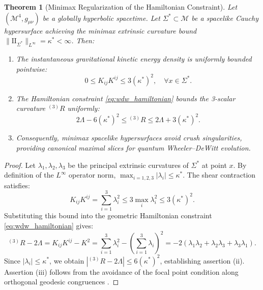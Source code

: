 \documentclass[11pt,a4paper,reqno]{amsart}
\newtheorem{theorem}{Theorem}[section]
\theoremstyle{definition}
\numberwithin{equation}{section}
\providecommand{\II}{\mathrm{I\!I}}
\providecommand{\II}{\mathrm{II}}
\begin{document}
\begin{theorem}[Minimax Regularization of the Hamiltonian Constraint]
\label{thm:minimax_hamiltonian_regularization}
Let $(\mathcal{M}^4, g_{\mu\nu})$ be a globally hyperbolic spacetime. Let $\Sigma^* \subset \mathcal{M}$ be a spacelike Cauchy hypersurface achieving the minimax extrinsic curvature bound $\|\II_{\Sigma^*}\|_{L^\infty} = \kappa^* < \infty$. Then:
\begin{enumerate}[label=(\roman*)]
    \item The instantaneous gravitational kinetic energy density is uniformly bounded pointwise:
    \begin{equation}
        \label{eq:shear_bound}
        0 \le K_{ij} K^{ij} \le 3 (\kappa^*)^2, \quad \forall x \in \Sigma^*.
    \end{equation}
    \item The Hamiltonian constraint \eqref{eq:wdw_hamiltonian} bounds the 3-scalar curvature ${}^{(3)}R$ uniformly:
    \begin{equation}
        2\Lambda - 6 (\kappa^*)^2 \le {}^{(3)}R \le 2\Lambda + 3(\kappa^*)^2.
    \end{equation}
    \item Consequently, minimax spacelike hypersurfaces avoid crush singularities, providing canonical maximal slices for quantum Wheeler--DeWitt evolution.
\end{enumerate}
\end{theorem}
\begin{proof}
Let $\lambda_1, \lambda_2, \lambda_3$ be the principal extrinsic curvatures of $\Sigma^*$ at point $x$. By definition of the $L^\infty$ operator norm, $\max_{i=1,2,3} |\lambda_i| \le \kappa^*$. The shear contraction satisfies:
\begin{equation}
    K_{ij} K^{ij} = \sum_{i=1}^3 \lambda_i^2 \le 3 \max_i \lambda_i^2 \le 3 (\kappa^*)^2.
\end{equation}
Substituting this bound into the geometric Hamiltonian constraint \eqref{eq:wdw_hamiltonian} gives:
\begin{equation}
    {}^{(3)}R - 2\Lambda = K_{ij} K^{ij} - K^2 = \sum_{i=1}^3 \lambda_i^2 - \left(\sum_{i=1}^3 \lambda_i\right)^2 = -2(\lambda_1 \lambda_2 + \lambda_2 \lambda_3 + \lambda_3 \lambda_1).
\end{equation}
Since $|\lambda_i| \le \kappa^*$, we obtain $|{}^{(3)}R - 2\Lambda| \le 6(\kappa^*)^2$, establishing assertion (ii). Assertion (iii) follows from the avoidance of the focal point condition along orthogonal geodesic congruences \cite{silvafilho2026noneuclidean}.
\end{proof}
\end{document}
